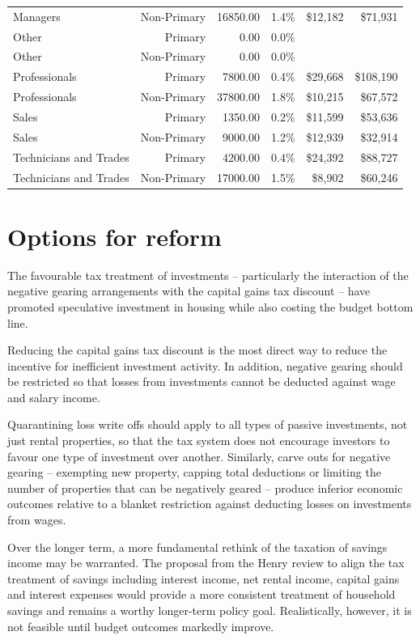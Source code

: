 \documentclass{grattan}\usepackage[]{graphicx}\usepackage[]{color}
\begin{document}
\begin{table}
\begin{tabular}{lrrrrr}
  Managers & Non-Primary & 16850.00 & 1.4\% & \$12,182 & \$71,931 \\ 
   [6pt]Other & Primary & 0.00 & 0.0\% &  &  \\ 
  Other & Non-Primary & 0.00 & 0.0\% &  &  \\ 
   [6pt]Professionals & Primary & 7800.00 & 0.4\% & \$29,668 & \$108,190 \\ 
  Professionals & Non-Primary & 37800.00 & 1.8\% & \$10,215 & \$67,572 \\ 
   [6pt]Sales & Primary & 1350.00 & 0.2\% & \$11,599 & \$53,636 \\ 
  Sales & Non-Primary & 9000.00 & 1.2\% & \$12,939 & \$32,914 \\ 
   [6pt]Technicians and Trades & Primary & 4200.00 & 0.4\% & \$24,392 & \$88,727 \\ 
  Technicians and Trades & Non-Primary & 17000.00 & 1.5\% & \$8,902 & \$60,246 \\ 
   \bottomrule
\end{tabular}

\end{table}


\chapter{Options for reform}
The favourable tax treatment of investments -- particularly the interaction of the negative gearing arrangements with the capital gains tax discount -- have promoted speculative investment in housing while also costing the budget bottom line. 

Reducing the capital gains tax discount is the most direct way to reduce the incentive for inefficient investment activity. In addition, negative gearing should be restricted so that losses from investments cannot be deducted against wage and salary income. 

Quarantining loss write offs should apply to all types of passive investments, not just rental properties, so that the tax system does not encourage investors to favour one type of investment over another. Similarly, carve outs for negative gearing -- exempting new property, capping total deductions or limiting the number of properties that can be negatively geared -- produce inferior economic outcomes relative to a blanket restriction against deducting losses on investments from wages.

Over the longer term, a more fundamental rethink of the taxation of savings income may be warranted. The proposal from the Henry review to align the tax treatment of savings including interest income, net rental income, capital gains and interest expenses would provide a more consistent treatment of household savings and remains a worthy longer-term policy goal.  Realistically, however, it is not feasible until budget outcomes markedly improve.
\end{document}
